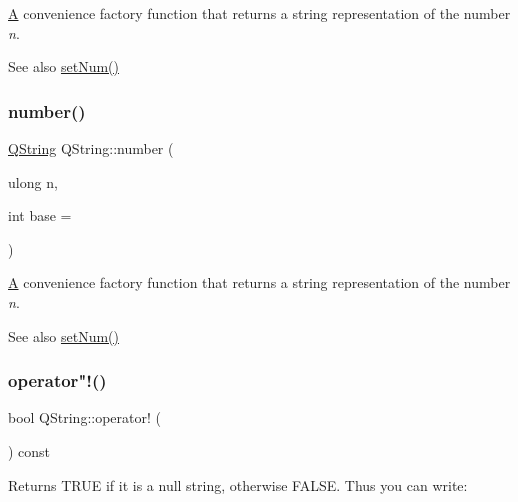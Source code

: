 \mbox{\hyperlink{class_a}{A}} convenience factory function that returns a string representation of the number {\itshape n}.

\begin{DoxySeeAlso}{See also}
\mbox{\hyperlink{class_q_string_accbb06e3141abc70c20ccee59a20b1f5}{set\+Num()}} 
\end{DoxySeeAlso}
\mbox{\label{class_q_string_a8d0965cab4025b7babc1aaa7d84aeb69}} 
\subsubsection{\texorpdfstring{number()}{number()}\hspace{0.1cm}{\footnotesize\ttfamily [5/5]}}
{\footnotesize\ttfamily \mbox{\hyperlink{class_q_string}{Q\+String}} Q\+String\+::number (\begin{DoxyParamCaption}\item[{ulong}]{n,  }\item[{int}]{base = {} }\end{DoxyParamCaption})\hspace{0.3cm}{\ttfamily [static]}}

\mbox{\hyperlink{class_a}{A}} convenience factory function that returns a string representation of the number {\itshape n}.

\begin{DoxySeeAlso}{See also}
\mbox{\hyperlink{class_q_string_accbb06e3141abc70c20ccee59a20b1f5}{set\+Num()}} 
\end{DoxySeeAlso}
\mbox{\label{class_q_string_a3c2e731ef300d9d649d976148f60f47c}} 
\subsubsection{\texorpdfstring{operator"!()}{operator!()}}
{\footnotesize\ttfamily bool Q\+String\+::operator! (\begin{DoxyParamCaption}{ }\end{DoxyParamCaption}) const\hspace{0.3cm}{\ttfamily [inline]}}

Returns T\+R\+UE if it is a null string, otherwise F\+A\+L\+SE. Thus you can write\+:


